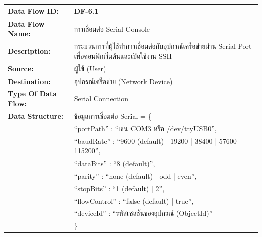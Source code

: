 \begin{table}[H]
    \caption{}
    \label{tab:df-6-1}
    \fontSixTeen 
    \begin{tabularx}{\textwidth}{|l|L|} 
        \hline
        \textbf{Data Flow ID:} & DF-6.1 \\
        \hline
        \textbf{Data Flow Name:} & การเชื่อมต่อ Serial Console \\
        \hline
        \textbf{Description:} & กระบวนการที่ผู้ใช้ทำการเชื่อมต่อกับอุปกรณ์เครือข่ายผ่าน Serial Port เพื่อคอนฟิกเริ่มต้นและเปิดใช้งาน SSH \\
        \hline
        \textbf{Source:} & ผู้ใช้ (User) \\
        \hline
        \textbf{Destination:} & อุปกรณ์เครือข่าย (Network Device) \\
        \hline
        \textbf{Type Of Data Flow:} & Serial Connection \\
        \hline
        \textbf{Data Structure:} & ข้อมูลการเชื่อมต่อ Serial = \{ \nonumber \\
                        & \hspace{1em} ``portPath'' : ``เช่น COM3 หรือ /dev/ttyUSB0'', \nonumber \\
                        & \hspace{1em} ``baudRate'' : ``9600 (default) | 19200 | 38400 | 57600 | 115200'', \nonumber \\
                        & \hspace{1em} ``dataBits'' : ``8 (default)'', \nonumber \\
                        & \hspace{1em} ``parity'' : ``none (default) | odd | even'', \nonumber \\
                        & \hspace{1em} ``stopBits'' : ``1 (default) | 2'', \nonumber \\
                        & \hspace{1em} ``flowControl'' : ``false (default) | true'', \nonumber \\
                        & \hspace{1em} ``deviceId'' : ``รหัสเซสชันของอุปกรณ์ (ObjectId)'' \nonumber \\
                        & \} \\
        \hline
    \end{tabularx}
\end{table}

